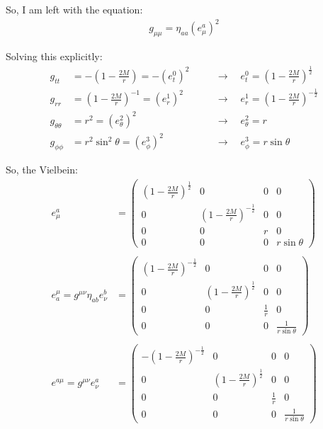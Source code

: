 \documentclass[12pt]{article}
\begin{document}
So, I am left with the equation:
\begin{align*}
  g_{\mu\mu} = \eta_{aa}(e^a_\mu)^2
\end{align*}

Solving this explicitly:
\begin{align*}
  g_{tt} &= -\left(1 - \frac{2M}{r}\right) = -(e^0_t)^2 \quad
  &&\rightarrow \quad e^0_t = \left(1 - \frac{2M}{r}\right)^\frac{1}{2} \\
  g_{rr} &= \left(1 - \frac{2M}{r}\right)^{-1} = (e^1_r)^2 \quad
  &&\rightarrow \quad e^1_r = \left(1 - \frac{2M}{r}\right)^{-\frac{1}{2}} \\
  g_{\theta\theta} &= r^2 = (e^2_\theta)^2 \quad
  &&\rightarrow \quad e^2_\theta = r \\
  g_{\phi\phi} &= r^2\sin^2{\theta} = (e^3_\phi)^2 \quad
  &&\rightarrow \quad e^3_\phi = r\sin{\theta}
\end{align*}

So, the Vielbein:
\begin{align*}
  e^a_\mu &= 
  \begin{pmatrix}
    \left(1 - \frac{2M}{r}\right)^\frac{1}{2} & 0 & 0 & 0 \\
    0 & \left(1 - \frac{2M}{r}\right)^{-\frac{1}{2}} & 0 & 0 \\
    0 & 0 & r & 0 \\
    0 & 0 & 0 & r\sin{\theta}
  \end{pmatrix} \\ \\
  e^\mu_a = g^{\mu\nu}\eta_{ab}e^b_\nu &=
  \begin{pmatrix}
    \left(1 - \frac{2M}{r}\right)^{-\frac{1}{2}} & 0 & 0 & 0 \\
    0 & \left(1 - \frac{2M}{r}\right)^\frac{1}{2} & 0 & 0 \\
    0 & 0 & \frac{1}{r} & 0 \\
    0 & 0 & 0 & \frac{1}{r\sin{\theta}}
  \end{pmatrix} \\ \\
  e^{a\mu} = g^{\mu\nu}e^a_\nu &=
  \begin{pmatrix}
    -\left(1 - \frac{2M}{r}\right)^{-\frac{1}{2}} & 0 & 0 & 0 \\
    0 & \left(1 - \frac{2M}{r}\right)^\frac{1}{2} & 0 & 0 \\
    0 & 0 & \frac{1}{r} & 0 \\
    0 & 0 & 0 & \frac{1}{r\sin{\theta}}
  \end{pmatrix}
\end{align*}
\end{document}
